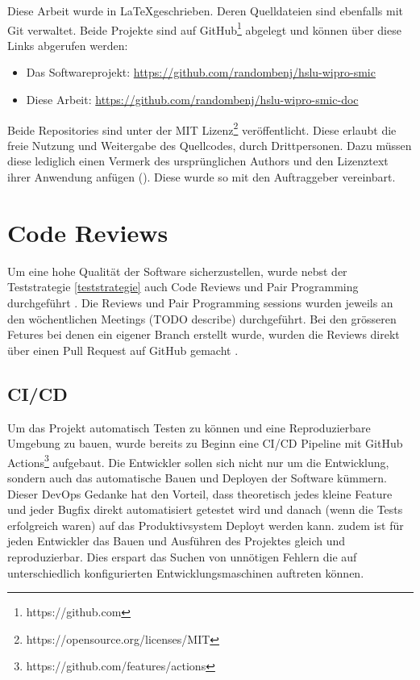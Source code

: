 Diese Arbeit wurde in \LaTeX geschrieben. Deren Quelldateien sind ebenfalls mit Git verwaltet.
Beide Projekte sind auf GitHub\footnote{https://github.com} abgelegt und können über diese Links abgerufen werden:

\begin{itemize}
    \item Das Softwareprojekt: \url{https://github.com/randombenj/hslu-wipro-smic}
    \item Diese Arbeit: \url{https://github.com/randombenj/hslu-wipro-smic-doc}
\end{itemize}

Beide Repositories sind unter der MIT Lizenz\footnote{https://opensource.org/licenses/MIT} veröffentlicht.
Diese erlaubt die freie Nutzung und Weitergabe des Quellcodes, durch Drittpersonen.
Dazu müssen diese lediglich einen Vermerk des ursprünglichen Authors und den Lizenztext ihrer Anwendung anfügen (\parencite{mit_licence}).
Diese wurde so mit den Auftraggeber vereinbart.

\section{Code Reviews}

Um eine hohe Qualität der Software sicherzustellen, wurde nebst der Teststrategie \ref{teststrategie}
auch Code Reviews und Pair Programming durchgeführt \parencite{fu2017code}.
Die Reviews und Pair Programming sessions wurden jeweils an den wöchentlichen
Meetings (TODO describe) durchgeführt.
Bei den grösseren Fetures bei denen ein eigener Branch erstellt wurde, wurden die
Reviews direkt über einen Pull Request auf GitHub gemacht \parencite{github_flow_docs_2021}.

\subsection{\ac{CI/CD}}

Um das Projekt automatisch Testen zu können und eine Reproduzierbare Umgebung zu bauen,
wurde bereits zu Beginn eine \ac{CI/CD} Pipeline mit GitHub Actions\footnote{https://github.com/features/actions}
aufgebaut.
Die Entwickler sollen sich nicht nur um die Entwicklung, sondern auch das automatische Bauen und Deployen der
Software kümmern. Dieser DevOps Gedanke hat den Vorteil, dass
theoretisch jedes kleine Feature und jeder Bugfix direkt automatisiert getestet
wird und danach (wenn die Tests erfolgreich waren) auf das Produktivsystem
Deployt werden kann. \cite{what_is_devops}
zudem ist für jeden Entwickler das Bauen und Ausführen des Projektes gleich und
reproduzierbar. Dies erspart das Suchen von unnötigen Fehlern die auf unterschiedlich
konfigurierten Entwicklungsmaschinen auftreten können.

